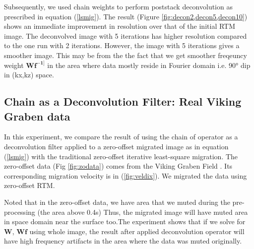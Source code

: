 

%

Subsequently, we used chain weights to perform poststack deconvolution as prescribed in equation (\ref{lsmig}). The result (Figure \ref{fig:decon2,decon5,decon10}) shows an immediate improvement in resolution over that of the initial RTM image. The deconvolved image with 5 iterations has higher resolution compared to the one run with 2 iterations. However, the image with 5 iterations gives a smoother image. This may be from the the fact that we get smoother freqeuncy weight $\mathbf{Wf^{-1]}}$ in the area where data mostly reside in Fourier domain i.e. 90° dip in (kx,kz) space.



%
%

\subsection*{Chain as a Deconvolution Filter: Real Viking Graben data}

In this experiment, we compare the result of using the chain of operator as a deconvolution filter applied to a zero-offset migrated image as in equation (\ref{lsmig}) with the traditional zero-offset iterative least-square migration. The zero-offset data (Fig \ref{fig:zodata}) comes from the Viking Graben Field \cite[]{keys1998comparison}. Its corresponding migration velocity is in (\ref{fig:veldix}). We migrated the data using zero-offset RTM. 


Noted that in the zero-offset data, we have area that we muted during the pre-processing (the area above 0.4s) Thus, the migrated image will have muted area in space domain near the surface too.The experiment shows that if we solve for $\mathbf{W}$, $\mathbf{Wf}$ using whole image, the result after applied deconvolution operator will have high frequency artifacts in the area where the data was muted originally.

